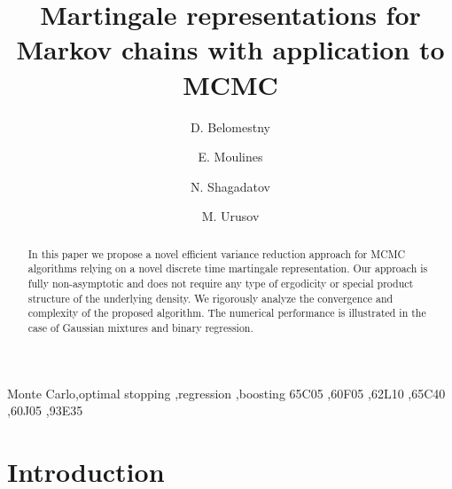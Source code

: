\documentclass[article]{elsarticle}
\begin{document}
\begin{frontmatter}

\title{Martingale representations  for Markov chains   with application to MCMC }


\author[address1,address2]{D. Belomestny}

\author[address3,address2]{E. Moulines}
\author[address2]{N. Shagadatov}
\author[address1]{M. Urusov}


\address[address1]{Duisburg-Essen University, Essen}
\address[address2]{National University Higher School of Economics, Moscow}
\address[address3]{Centre de Math\'ematiques Appliqu\'ees, UMR 7641, Ecole Polytechnique, France}

\begin{abstract}
In this paper we propose a novel efficient variance reduction approach for  MCMC algorithms relying on a novel discrete time martingale representation. Our approach is fully non-asymptotic and does not require any type of ergodicity or special product structure of the underlying density.  We rigorously analyze the convergence  and  complexity of the proposed algorithm. The numerical performance is illustrated  in the case of Gaussian mixtures and binary regression.
\end{abstract}

\begin{keyword}
Monte Carlo\sep optimal stopping \sep regression \sep boosting
\MSC[2010] 65C05 \sep 60F05 \sep 62L10 \sep 65C40 \sep 60J05 \sep 93E35

\end{keyword}

\end{frontmatter}

\linenumbers

\section{Introduction}
\end{document}
